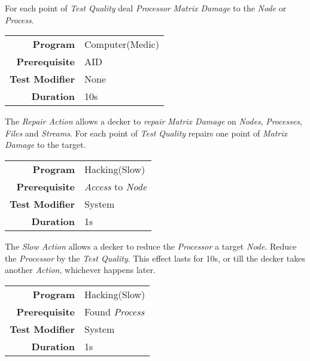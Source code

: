 \hfill

For each point of \emph{Test Quality} deal \emph{Processor} \emph{Matrix Damage}
to the \emph{Node} or \emph{Process}.

\label{par:repair}


\begin{tabular}{rl}
    \textbf{Program}       & Computer(Medic) \\
    \textbf{Prerequisite}  & AID             \\
    \textbf{Test Modifier} & None            \\
    \textbf{Duration}      & 10s             \\
\end{tabular}

\hfill

The \emph{Repair Action} allows a decker to \emph{repair} \emph{Matrix Damage}
on \emph{Nodes}, \emph{Processes}, \emph{Files} and \emph{Streams}.
For each point of \emph{Test Quality} repairs one point of \emph{Matrix Damage}
to the target.


\label{par:slow node}


\begin{tabular}{rl}
    \textbf{Program}       & Hacking(Slow)                \\
    \textbf{Prerequisite}  & \emph{Access} to \emph{Node} \\
    \textbf{Test Modifier} & System                       \\
    \textbf{Duration}      & 1s                           \\
\end{tabular}

\hfill

The \emph{Slow Action} allows a decker to reduce the \emph{Processor} a target
\emph{Node}. Reduce the \emph{Processor} by the \emph{Test Quality}. This effect
lasts for 10s, or till the decker takes another \emph{Action}, whichever happens
later.

\label{par:slow process}


\begin{tabular}{rl}
    \textbf{Program}       & Hacking(Slow)        \\
    \textbf{Prerequisite}  & Found \emph{Process} \\
    \textbf{Test Modifier} & System               \\
    \textbf{Duration}      & 1s                   \\
\end{tabular}


